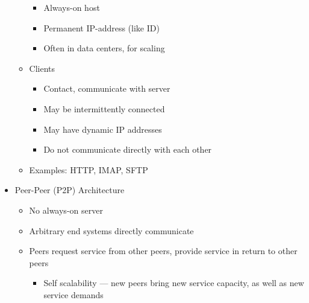 \begin{itemize}
\begin{itemize}
        \begin{itemize}

          \item Always-on host

          \item Permanent IP-address (like ID)

          \item Often in data centers, for scaling

        \end{itemize}

      \item Clients

        \begin{itemize}

          \item Contact, communicate with server

          \item May be intermittently connected

          \item May have dynamic IP addresses

          \item Do not communicate directly with each other

        \end{itemize}

      \item Examples: HTTP, IMAP, SFTP

    \end{itemize}

  \item Peer-Peer (P2P) Architecture

    \begin{itemize}

      \item No always-on server

      \item Arbitrary end systems directly communicate

      \item Peers request service from other peers, provide service in return to other peers

        \begin{itemize}

          \item Self scalability — new peers bring new service capacity, as well as new service demands

        \end{itemize}


\end{itemize}
\end{itemize}
